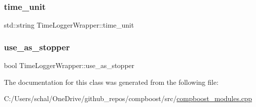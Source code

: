 \subsubsection{\texorpdfstring{time\+\_\+unit}{time\_unit}}
{\footnotesize\ttfamily std\+::string Time\+Logger\+Wrapper\+::time\+\_\+unit\hspace{0.3cm}{\ttfamily [private]}}

\mbox{\label{class_time_logger_wrapper_a00f5b655adb9bf054e6f0b8f7b8be225}} 
\subsubsection{\texorpdfstring{use\+\_\+as\+\_\+stopper}{use\_as\_stopper}}
{\footnotesize\ttfamily bool Time\+Logger\+Wrapper\+::use\+\_\+as\+\_\+stopper\hspace{0.3cm}{\ttfamily [private]}}



The documentation for this class was generated from the following file\+:\begin{DoxyCompactItemize}
\item 
C\+:/\+Users/schal/\+One\+Drive/github\+\_\+repos/compboost/src/\mbox{\hyperlink{compboost__modules_8cpp}{compboost\+\_\+modules.\+cpp}}\end{DoxyCompactItemize}
